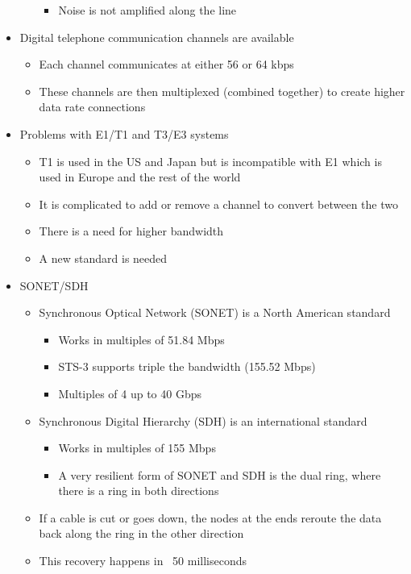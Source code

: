 \begin{itemize}
\begin{itemize}
\begin{itemize}
      \item Noise is not amplified along the line
    \end{itemize}
  \end{itemize}
  \item Digital telephone communication channels are available
  \begin{itemize}
    \item Each channel communicates at either 56 or 64 kbps
    \item These channels are then multiplexed (combined together) to create higher data rate connections
  \end{itemize}
  \item Problems with E1/T1 and T3/E3 systems
  \begin{itemize}
    \item T1 is used in the US and Japan but is incompatible with E1 which is used in Europe and the rest of the world
    \item It is complicated to add or remove a channel to convert between the two
    \item There is a need for higher bandwidth
    \item A new standard is needed
  \end{itemize}
  \item SONET/SDH
  \begin{itemize}
    \item Synchronous Optical Network (SONET) is a North American standard
    \begin{itemize}
      \item Works in multiples of 51.84 Mbps
      \item STS-3 supports triple the bandwidth (155.52 Mbps)
      \item Multiples of 4 up to 40 Gbps
    \end{itemize}
    \item Synchronous Digital Hierarchy (SDH) is an international standard
    \begin{itemize}
      \item Works in multiples of 155 Mbps
      \item A very resilient form of SONET and SDH is the dual ring, where there is a ring in both directions
    \end{itemize}
    \item If a cable is cut or goes down, the nodes at the ends reroute the data back along the ring in the other direction
    \item This recovery happens in ~50 milliseconds
  \end{itemize}
\end{itemize}